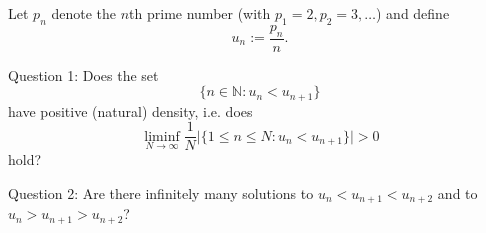 Let $p_n$ denote the $n$th prime number (with $p_1=2,p_2=3,\dots$) and define
\[
 u_n := \frac{p_n}{n}.
\]

Question 1: Does the set
\[
\{n\in\mathbb N: u_n < u_{n+1}\}
\]
have positive (natural) density, i.e. does
\[
\liminf_{N\to\infty} \frac{1}{N}\bigl|\{1\le n\le N: u_n<u_{n+1}\}\bigr| >0
\]
hold?

Question 2: Are there infinitely many solutions to $u_n<u_{n+1}<u_{n+2}$ and to $u_n>u_{n+1}>u_{n+2}$?
